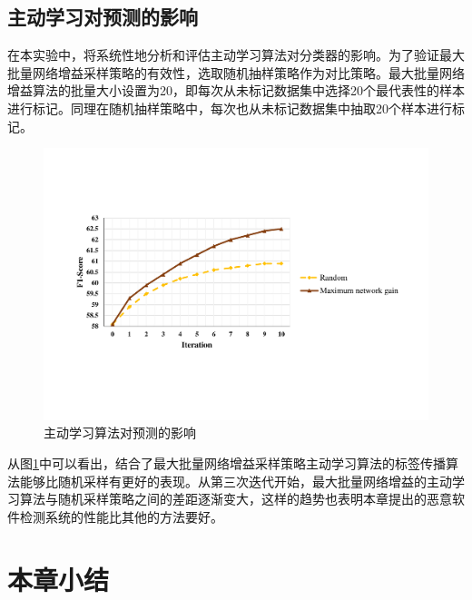 \subsection{主动学习对预测的影响}
在本实验中，将系统性地分析和评估主动学习算法对分类器的影响。为了验证最大批量网络增益采样策略的有效性，选取随机抽样策略作为对比策略。最大批量网络增益算法的批量大小设置为20，即每次从未标记数据集中选择20个最代表性的样本进行标记。同理在随机抽样策略中，每次也从未标记数据集中抽取20个样本进行标记。

\begin{figure}[!ht]
\centering
\includegraphics[width=5in]{img/chap3/AL_Comparison.pdf}
\caption{主动学习算法对预测的影响}
\label{fig_ResALComparison}
\end{figure}

从图\ref{fig_ResALComparison}中可以看出，结合了最大批量网络增益采样策略主动学习算法的标签传播算法能够比随机采样有更好的表现。从第三次迭代开始，最大批量网络增益的主动学习算法与随机采样策略之间的差距逐渐变大，这样的趋势也表明本章提出的恶意软件检测系统的性能比其他的方法要好。

\section{本章小结}